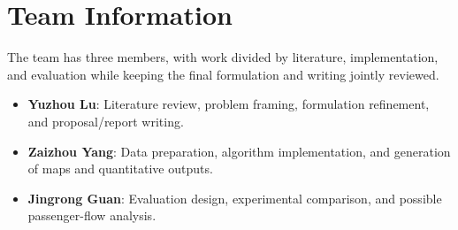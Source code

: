 \documentclass[9pt,a4paper,twocolumn,twoside]{tau-class/tau}
\begin{document}
\section{Team Information}

    The team has three members, with work divided by literature, implementation, and evaluation while keeping the final formulation and writing jointly reviewed.

    \begin{itemize}
        \item \textbf{Yuzhou Lu}: Literature review, problem framing, formulation refinement, and proposal/report writing.
        \item \textbf{Zaizhou Yang}: Data preparation, algorithm implementation, and generation of maps and quantitative outputs.
        \item \textbf{Jingrong Guan}: Evaluation design, experimental comparison, and possible passenger-flow analysis.
    \end{itemize}


\printbibliography

\end{document}
